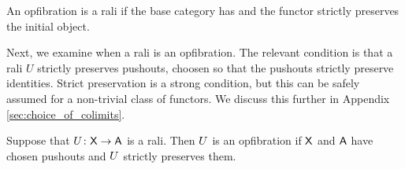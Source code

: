 \documentclass{amsart}
\begin{document}
\begin{cor}
  An opfibration is a rali if the base category has and the functor strictly preserves the initial object.
\end{cor}

Next, we examine when a rali is an opfibration. The relevant condition is that a rali $U$ strictly preserves pushouts, choosen so that the pushouts strictly preserve identities. Strict preservation is a strong condition, but this can be safely assumed for a non-trivial class of functors.  We discuss this further in Appendix \ref{sec:choice_of_colimits}.

\begin{prop}\label{prop:laritoopfib}
  Suppose that $U\colon\mathsf{X}\to\mathsf{A}$ is a rali. Then $U$ is an opfibration if $\mathsf{X}$ and $\mathsf{A}$ have chosen pushouts and $U$ strictly preserves them.
\end{prop}
\end{document}
